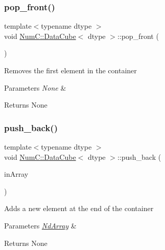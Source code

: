 \subsubsection{\texorpdfstring{pop\+\_\+front()}{pop\_front()}}
{\footnotesize\ttfamily template$<$typename dtype $>$ \\
void \mbox{\hyperlink{class_num_c_1_1_data_cube}{Num\+C\+::\+Data\+Cube}}$<$ dtype $>$\+::pop\+\_\+front (\begin{DoxyParamCaption}{ }\end{DoxyParamCaption})\hspace{0.3cm}{\ttfamily [inline]}}

Removes the first element in the container


\begin{DoxyParams}{Parameters}
{\em None} & \\
\hline
\end{DoxyParams}
\begin{DoxyReturn}{Returns}
None 
\end{DoxyReturn}
\mbox{\label{class_num_c_1_1_data_cube_aeadab8945ec7c380ae010e23c5ace1ec}} 
\subsubsection{\texorpdfstring{push\+\_\+back()}{push\_back()}}
{\footnotesize\ttfamily template$<$typename dtype $>$ \\
void \mbox{\hyperlink{class_num_c_1_1_data_cube}{Num\+C\+::\+Data\+Cube}}$<$ dtype $>$\+::push\+\_\+back (\begin{DoxyParamCaption}\item[{const \mbox{\hyperlink{class_num_c_1_1_nd_array}{Nd\+Array}}$<$ dtype $>$ \&}]{in\+Array }\end{DoxyParamCaption})\hspace{0.3cm}{\ttfamily [inline]}}

Adds a new element at the end of the container


\begin{DoxyParams}{Parameters}
{\em \mbox{\hyperlink{class_num_c_1_1_nd_array}{Nd\+Array}}} & \\
\hline
\end{DoxyParams}
\begin{DoxyReturn}{Returns}
None 
\end{DoxyReturn}
\mbox{\label{class_num_c_1_1_data_cube_a3f386367e0a1a6f00b535c7d97198ade}} 
